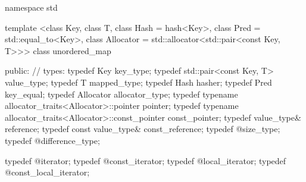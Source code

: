 \begin{codeblock}
namespace std {
  template <class Key,
            class T,
            class Hash = hash<Key>,
            class Pred = std::equal_to<Key>,
            class Allocator = std::allocator<std::pair<const Key, T>>>
  class unordered_map {
  public:
    // types:
    typedef Key                                                 key_type;
    typedef std::pair<const Key, T>                             value_type;
    typedef T                                                   mapped_type;
    typedef Hash                                                hasher;
    typedef Pred                                                key_equal;
    typedef Allocator                                           allocator_type;
    typedef typename allocator_traits<Allocator>::pointer       pointer;
    typedef typename allocator_traits<Allocator>::const_pointer const_pointer;
    typedef value_type&                                         reference;
    typedef const value_type&                                   const_reference;
    typedef @\impdefnc@                              size_type;
    typedef @\impdefnc@                              difference_type;

    typedef @\impdefnc@                              iterator;
    typedef @\impdefnc@                              const_iterator;
    typedef @\impdefnc@                              local_iterator;
    typedef @\impdefnc@                              const_local_iterator;

}}
\end{codeblock}
